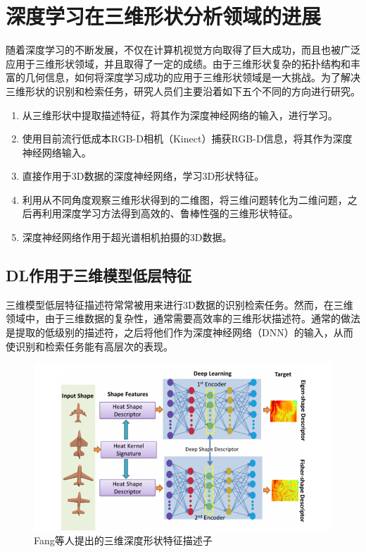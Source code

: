 
\chapter{深度学习在三维形状分析领域的进展}

随着深度学习的不断发展，不仅在计算机视觉方向取得了巨大成功，而且也被广泛应用于三维形状领域，并且取得了一定的成绩。由于三维形状复杂的拓扑结构和丰富的几何信息，如何将深度学习成功的应用于三维形状领域是一大挑战。为了解决三维形状的识别和检索任务，研究人员们主要沿着如下五个不同的方向进行研究。

\begin{enumerate}
\item 从三维形状中提取描述特征，将其作为深度神经网络的输入，进行学习。
\item 使用目前流行低成本RGB-D相机（Kinect）捕获RGB-D信息，将其作为深度神经网络输入。
\item 直接作用于3D数据的深度神经网络，学习3D形状特征。
\item 利用从不同角度观察三维形状得到的二维图，将三维问题转化为二维问题，之后再利用深度学习方法得到高效的、鲁棒性强的三维形状特征。
\item 深度神经网络作用于超光谱相机拍摄的3D数据。
\end{enumerate}

\section{DL作用于三维模型低层特征}

三维模型低层特征描述符常常被用来进行3D数据的识别检索任务。然而，在三维领域中，由于三维数据的复杂性，通常需要高效率的三维形状描述符。通常的做法是提取的低级别的描述符，之后将他们作为深度神经网络（DNN）的输入，从而使识别和检索任务能有高层次的表现。
\begin{figure}[tb]
\begin{center}
\includegraphics[width=0.9\linewidth]{figures/Fang.jpg} 
\end{center} 
\vspace{-4mm}
\caption{Fang等人提出的三维深度形状特征描述子} 
\label{fig_Fang}
\end{figure}


